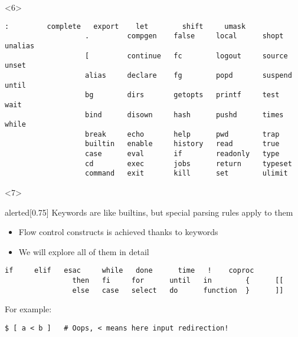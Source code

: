 \begin{frame}
\begin{overlayarea}{\textwidth}{0.7\textheight}
\begin{onlyenv}
\begin{onlyenv}
\begin{lstlisting}
                \end{lstlisting}
            \end{onlyenv}
            \begin{onlyenv}<6>
                \begin{lstlisting}[style=MyBash, numbers=none]
                   :         complete   export    let        shift     umask  
                   .         compgen    false     local      shopt     unalias
                   [         continue   fc        logout     source    unset  
                   alias     declare    fg        popd       suspend   until  
                   bg        dirs       getopts   printf     test      wait   
                   bind      disown     hash      pushd      times     while  
                   break     echo       help      pwd        trap      
                   builtin   enable     history   read       true      
                   case      eval       if        readonly   type      
                   cd        exec       jobs      return     typeset   
                   command   exit       kill      set        ulimit    
                \end{lstlisting}
            \end{onlyenv}
        \end{onlyenv}
        \begin{onlyenv}<7>
            \begin{varblock}{alerted}[0.75\textwidth]{}
                Keywords are like builtins, but \alert{special parsing rules apply to them}
            \end{varblock}
            \begin{itemize}
                \item Flow control constructs is achieved thanks to keywords
                \item We will explore all of them in detail 
            \end{itemize}
            \begin{lstlisting}[style=MyBash, numbers=none]
                if     elif   esac     while   done      time   !    coproc
                then   fi     for      until   in        {      [[
                else   case   select   do      function  }      ]]
            \end{lstlisting}
            \bigskip
            For example:
            \medskip
            \begin{lstlisting}[style=MyBash]
                $ [ a < b ]   # Oops, < means here input redirection!

\end{lstlisting}
\end{onlyenv}
\end{overlayarea}
\end{frame}
